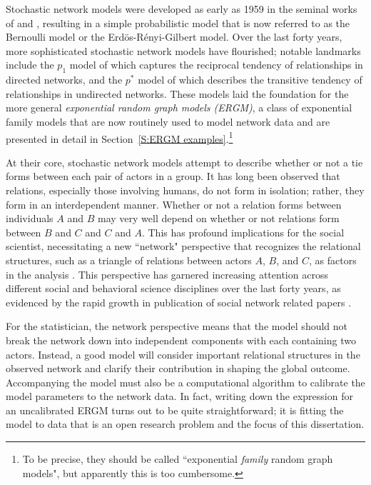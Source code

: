 Stochastic network models were developed as early as 1959 in the seminal works of 
\citet{Gilbert} and \citet{Erdos}, resulting in a simple probabilistic model that is 
now referred to as the Bernoulli model or the Erd\"{o}s-R\'{e}nyi-Gilbert model.  Over 
the last forty years, more sophisticated stochastic network models have flourished;  
notable landmarks include the $p_1$ model of \citet{Holland:1981} which captures the 
reciprocal tendency of relationships in directed networks, and the $p^*$ model of 
\citet{Frank:1986} which describes the transitive tendency of relationships in 
undirected networks.  These models laid the foundation for the more general 
\emph{exponential random graph models (ERGM)}, a class of exponential family 
models that are now routinely used to model network data and are presented in 
detail in Section~\ref{S:ERGM examples}.\footnote{To be precise, they should
be called ``exponential \emph{family} random graph models", but apparently
this is too cumbersome.} 

At their core, stochastic network models attempt to describe whether or not a tie 
forms between each pair of actors in a group.
It has long been observed that relations, especially those involving humans, do not 
form in isolation; rather, they form in an interdependent manner.  Whether or not a 
relation forms between individuals $A$ and $B$ may very well depend on whether or not 
relations form between $B$ and $C$ and $C$ and $A$.  This has profound implications 
for the social scientist, necessitating a new ``network" perspective that recognizes 
the relational structures, such as a triangle of relations between actors $A$, $B$, 
and $C$, as factors in the analysis \citep{Wasserman:1994}.  This perspective has 
garnered increasing attention across different social and behavioral science 
disciplines over the last forty years, as evidenced by the rapid growth in publication 
of social network related papers \citep{Knoke:2008}.
  
For the statistician, the network perspective means that the model should not break the 
network down into independent components with each containing two actors.
Instead, a good model will consider important relational structures in the observed network 
and clarify their contribution in shaping the global outcome.   
Accompanying the model must also be a computational algorithm to calibrate the model 
parameters to the network data.  
In fact, writing down the expression for an uncalibrated ERGM turns out to be quite
straightforward; it is fitting the model
to data that is an open research problem and the focus of this dissertation.

